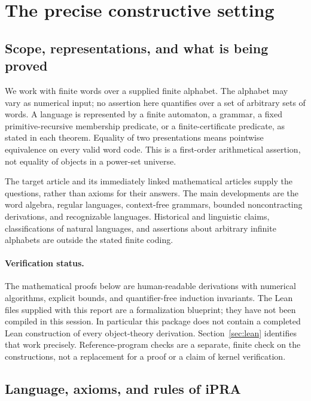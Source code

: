 \section{The precise constructive setting}
\label{sec:foundations}

\subsection{Scope, representations, and what is being proved}

We work with finite words over a supplied finite alphabet. The alphabet may
vary as numerical input; no assertion here quantifies over a set of arbitrary
sets of words. A language is represented by a finite automaton, a grammar,
a fixed primitive-recursive membership predicate, or a finite-certificate
predicate, as stated in each theorem. Equality of two presentations means
pointwise equivalence on every valid word code. This is a first-order
arithmetical assertion, not equality of objects in a power-set universe.

The target article and its immediately linked mathematical articles supply
the questions, rather than axioms for their answers. The main developments
are the word algebra, regular languages, context-free grammars, bounded
noncontracting derivations, and recognizable languages. Historical and
linguistic claims, classifications of natural languages, and assertions about
arbitrary infinite alphabets are outside the stated finite coding.

\paragraph{Verification status.}
The mathematical proofs below are human-readable derivations with numerical
algorithms, explicit bounds, and quantifier-free induction invariants. The
Lean files supplied with this report are a formalization blueprint; they
have not been compiled in this session. In particular this package does not
contain a completed Lean construction of every object-theory derivation.
Section~\ref{sec:lean} identifies that work precisely. Reference-program
checks are a separate, finite check on the constructions, not a replacement
for a proof or a claim of kernel verification.

\subsection{Language, axioms, and rules of iPRA}

